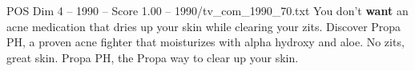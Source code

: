 \begin{textsample}{POS Dim 4 – 1990 – Score 1.00 – 1990/tv\_com\_1990\_70.txt}  \label{ex:f4_pos_030}
You don't \textbf{want} an acne medication that dries up your skin while clearing your zits.
Discover Propa PH, a proven acne fighter that moisturizes with alpha hydroxy and aloe.
No zits, great skin.
Propa PH, the Propa way to clear up your skin.

\end{textsample}
